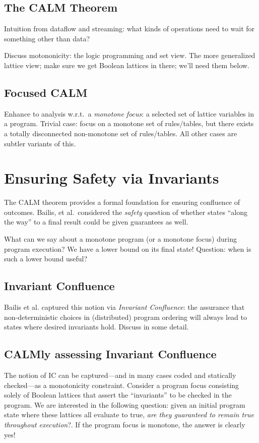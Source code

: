 \documentclass{sig-alternate}
\begin{document}
\subsection{The CALM Theorem}
Intuition from dataflow and streaming: what kinds of operations need to wait for something other than data?

Discuss motononicity: the logic programming and set view.  The more generalized lattice view; make sure we get Boolean lattices in there; we'll need them below.

\subsection{Focused CALM}

Enhance to analysis w.r.t.\ a \emph{monotone focus}: a selected set of lattice variables in a program.  Trivial case: focus on a monotone set of rules/tables, but there exists a totally disconnected non-monotone set of rules/tables.  All other cases are subtler variants of this.

\section{Ensuring Safety via Invariants}

The CALM theorem provides a formal foundation for ensuring confluence of outcomes.  Bailis, et al.~considered the \emph{safety} question of whether states ``along the way'' to a final result could be given guarantees as well.

What can we say about a monotone program (or a monotone focus) during program execution?  We have a lower bound on its final state!  Question: when is such a lower bound useful?

\subsection{Invariant Confluence}
Bailis et al. captured this notion via \emph{Invariant Confluence}: the assurance that non-deterministic choices in (distributed) program ordering will always lead to states where desired invariants hold.  Discuss in some detail.

\subsection{CALMly assessing Invariant Confluence}
The notion of IC can be captured---and in many cases coded and statically checked---as a monotonicity constraint.
Consider a program focus consisting solely of Boolean lattices that assert the ``invariants'' to be checked in the program. We are interested in the following question: given an initial program state where these lattices all evaluate to true, \emph{are they guaranteed to remain true throughout execution}?.  If the program focus is monotone, the answer is clearly yes!
\end{document}
